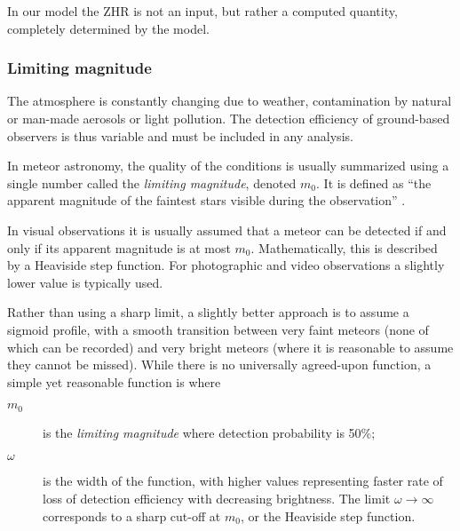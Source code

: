             In our model the ZHR is not an input, but rather a computed quantity, completely determined by the model.

        \subsubsection{Limiting magnitude} \label{ipqm}
            The atmosphere is constantly changing due to weather, contamination
            by natural or man-made aerosols or light pollution. The detection efficiency
            of ground-based observers is thus variable and must be included in any analysis.

            In meteor astronomy, the quality of the conditions is usually summarized
            using a single number called the \emph{limiting magnitude}, denoted $m_0$.
            It is defined as ``the apparent magnitude of the faintest stars visible during the observation'' \citep{imo-glossary}.

            In visual observations it is usually assumed that a meteor can be detected if and only if
            its apparent magnitude is at most $m_0$. Mathematically, this is described by a Heaviside step function.
            For photographic and video observations a slightly lower value is typically used.

            Rather than using a sharp limit, a slightly better approach is to assume a sigmoid profile,
            with a smooth transition between very faint meteors (none of which can be recorded)
            and very bright meteors (where it is reasonable to assume they cannot be missed).
            While there is no universally agreed-upon function, a simple yet reasonable function is
            where
            \begin{description}
                \item[$m_0$]    is the \textit{limiting magnitude} where detection probability is 50\%;
                \item[$\omega$] is the width of the function, with higher values representing
                    faster rate of loss of detection efficiency with decreasing brightness.
                    The limit $\omega \to \infty$ corresponds to a sharp cut-off at $m_0$,
                    or the Heaviside step function.
            \end{description}

